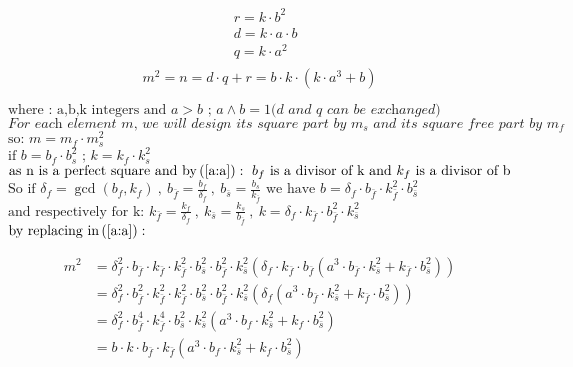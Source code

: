 \documentclass[10pt,a4paper]{letter}
\begin{document}
\begin{align*}
	& r=k\cdot b^{2} \\
	& d=k\cdot a \cdot b \\
	& q=k\cdot a^{2}\\
\end{align*}
\begin{equation}	 m^{2}=n=d \cdot q + r = b\cdot k \cdot \left(k \cdot a^{3}+b \right)\label{a:a}\end{equation}
\begin{flushleft}
$\text{where : a,b,k integers and } a > b \text{ ; }a\wedge b = 1   
\textit{(d and q can be exchanged)}$ \\ 
$\textit{For each element } m \textit{, we will design its square part by } m_{s} \textit{ and its square free part by } m_{f}$ \\
$\text{so: }m=m_{f}\cdot m_{s}^{2} $ \\
$ \text{if }  b=b_{f}\cdot b_{s}^{2} \text{ ; } k=k_{f}\cdot k_{s}^{2} $ \\
$\text{as n is a perfect square and by} \left( \ref{a:a}\right):\  b_{f} \text{ is a divisor of k and } k_{f} \text{ is a divisor of b} $
$\text{So if } \delta_{f}=\gcd (b_{f},k_{f})\ , \ b_{\bar{f}}=\frac{b_{f}}{\delta_{f}}\ , \  b_{\bar{s}}=\frac{b_{s}}{k_{\bar{f}}} \text{ we have } b=\delta_{f}\cdot b_{\bar{f}} \cdot k_{\bar{f}}^{2}\cdot b_{\bar{s}}^{2} $
$\text{and respectively for k: }k_{\bar{f}}=\frac{k_{f}}{\delta_{f}}\ , \  k_{\bar{s}}=\frac{k_{s}}{b_{\bar{f}}}\ , \  k=\delta_{f}\cdot k_{\bar{f}} \cdot b_{\bar{f}}^{2}\cdot k_{\bar{s}}^{2} $ \\
$\text{by replacing in} \left( \ref{a:a}\right):$
\end{flushleft}
\begin{align*}
m^{2} & =\delta_{f}^{2}\cdot b_{\bar{f}}\cdot k_{\bar{f}}\cdot k_{\bar{f}}^{2}\cdot b_{\bar{s}}^{2} \cdot b_{\bar{f}}^{2}\cdot k_{\bar{s}}^{2} \left(\delta_{f}\cdot k_{\bar{f}} \cdot b_{\bar{f}} \left(a^{3} \cdot b_{\bar{f}}\cdot k_{\bar{s}}^{2}  + k_{\bar{f}}\cdot b_{\bar{s}}^{2} \right) \right)  \\
 & =\delta_{f}^{2}\cdot b_{\bar{f}}^{2}\cdot k_{\bar{f}}^{2}\cdot k_{\bar{f}}^{2}\cdot b_{\bar{s}}^{2} \cdot b_{\bar{f}}^{2}\cdot k_{\bar{s}}^{2} \left(\delta_{f} \left(a^{3} \cdot b_{\bar{f}}\cdot k_{\bar{s}}^{2}  + k_{\bar{f}}\cdot b_{\bar{s}}^{2} \right) \right) \\
  & =\delta_{f}^{2}\cdot b_{\bar{f}}^{4}\cdot k_{\bar{f}}^{4}\cdot  b_{\bar{s}}^{2} \cdot k_{\bar{s}}^{2} \left(a^{3} \cdot b_{f}\cdot k_{\bar{s}}^{2}  + k_{f}\cdot b_{\bar{s}}^{2} \right) \\
  & = b \cdot k \cdot b_{\bar{f}}  \cdot k _{\bar{f}} \left(a^{3} \cdot b_{f}\cdot k_{\bar{s}}^{2}  + k_{f}\cdot b_{\bar{s}}^{2} \right) \\
\end{align*}
\end{document}
